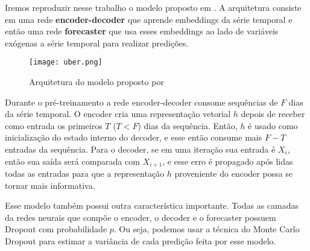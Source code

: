 Iremos reproduzir nesse trabalho o modelo proposto em \cite{ubertime}. A
arquitetura consiste em uma rede \textbf{encoder-decoder} que aprende embeddings da
série temporal e então uma rede \textbf{forecaster} que usa esses embeddings ao lado de
variáveis exógenas a série temporal para realizar predições.  


\begin{figure}[H]
\centering
\texttt{[image: uber.png]}
\caption{Arquitetura do modelo proposto por \cite{ubertime}}
\end{figure}


Durante o pré-treinamento a rede encoder-decoder consome sequências de $F$ dias
da série temporal. O encoder cria uma representação vetorial $h$ depois de
receber como entrada os primeiros $T$ ($T < F$) dias da sequência. Então, $h$ é usado como
inicialização do estado interno do decoder, e esse então consume mais $F - T$
entradas da sequência. Para o decoder, se em uma iteração sua entrada é $X_i$,
então sua saída será comparada com $X_{i+1}$, e esse erro é propagado após lidas
todas as entradas para que a representação $h$ proveniente do encoder possa se
tornar mais informativa.


Esse modelo também possui outra característica importante. Todas as camadas da
redes neurais que compõe o encoder, o decoder e o forecaster possuem
Dropout com probabilidade $p$. Ou seja, podemos usar a técnica do Monte
Carlo Dropout para estimar a variância de cada predição feita por esse modelo. \\








